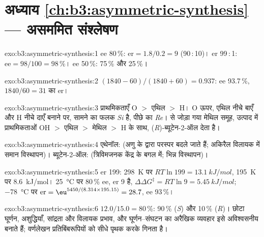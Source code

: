 \section*{अध्याय \ref{ch:b3:asymmetric-synthesis} --- असममित संश्लेषण}

\begin{solution}{exo:b3:asymmetric-synthesis:1}
ee 80\,\%: $\mathrm{er} = 1.8/0.2 = 9$ (90\,:\,10)। er 99\,:\,1: $\mathrm{ee} = 98/100 = 98$\,\%। ee 50\,\%: 75\,\% और 25\,\%।
\end{solution}

\begin{solution}{exo:b3:asymmetric-synthesis:2}
$(1840 - 60)/(1840 + 60) = 0.937$: ee 93.7\,\%, $1840/60 = 31$ का er।
\end{solution}

\begin{solution}{exo:b3:asymmetric-synthesis:3}
प्राथमिकताएँ O $>$ एथिल $>$ H। O ऊपर, एथिल नीचे बाएँ और H नीचे दाएँ बनाने पर,
सामने का फलक \textit{Si} है, पीछे का \textit{Re}।  से जोड़ा गया मेथिल समूह,
उत्पाद में प्राथमिकताओं OH $>$ एथिल $>$ मेथिल $>$ H के साथ, (\textit{R})-ब्यूटेन-2-ऑल देता है।
\end{solution}

\begin{solution}{exo:b3:asymmetric-synthesis:4}
एथेनॉल:  (अणु के  द्वारा परस्पर बदले जाते हैं; अकिरैल विलायक में
समान विस्थापन)। ब्यूटेन-2-ऑल:  (त्रिविमजनक केंद्र के बगल में;
भिन्न विस्थापन)।
\end{solution}

\begin{solution}{exo:b3:asymmetric-synthesis:5}
er 199: \qty{298}{K} पर $RT\ln 199 = \qty{13.1}{kJ/mol}$, \qty{195}{K} पर \qty{8.6}{kJ/mol}। \qty{25}{\celsius} पर 80\,\% ee, er 9 है,
$\Delta\Delta G^\ddagger = RT\ln 9 = \qty{5.45}{kJ/mol}$; \qty{-78}{\celsius} पर $\mathrm{er} = \eu^{5450/(8.314 \times 195.15)} = 28.7$, ee 93\,\%।
\end{solution}

\begin{solution}{exo:b3:asymmetric-synthesis:6}
 $12.0/15.0 = 80$\,\%: 90\,\% (\textit{S}) और 10\,\% (\textit{R})। छोटा घूर्णन, अशुद्धियाँ,
सांद्रता और विलायक प्रभाव, और घूर्णन--संघटन का अरैखिक
व्यवहार इसे अविश्वसनीय बनाते हैं; वर्णलेखन प्रतिबिंबरूपियों को सीधे पृथक करके
गिनता है।
\end{solution}

